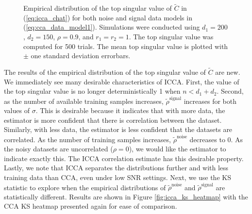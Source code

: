 \begin{figure}[h!]
{    \label{fig:icca_errorbars_high_snf}
  }
  \caption{Empirical distribution of the top singular value of $\widetilde{C}$ in
    (\ref{eq:icca_chat}) for both noise and signal data models in
    (\ref{eq:cca_data_model1}). Simulations were conducted using $d_1=200$, $d_2=150$,
    $\rho=0.9$, and $r_1=r_2=1$. The top singular value was computed for 500 trials. The
    mean top singular value is plotted with $\pm$ one standard deviation errorbars.}
  \label{fig:icca_errorbars}
\end{figure}

The results of the empirical distribution of the top singular value of $\widetilde{C}$ are
new. We immediately see many desirable characteristics of ICCA. First, the value of the
top singular value is no longer deterministically 1 when $n<d_1+d_2$. Second, as the
number of available training samples increases, $\tilde{\rho}^{\text{signal}}$ increases
for both values of $\sigma$.  This is desirable because it indicates that with more data,
the estimator is more confident that there is correlation between the dataset. Similarly,
with less data, the estimator is less confident that the datasets are correlated. As the
number of training samples increases, $\widetilde{\rho}^{\text{noise}}$ decreases to 0.
As the noisy datasets are uncorrelated ($\rho=0$), we would like the estimator to indicate
exactly this. The ICCA correlation estimate has this desirable property. Lastly, we note
that ICCA separates the distributions further and with less training data than CCA, even
under low SNR settings. Next, we use the KS statistic to explore when the empirical
distributions of $\widetilde{\rho}^{\text{noise}}$ and $\widetilde{\rho}^{\text{signal}}$
are statistically different. Results are shown in Figure \ref{fig:icca_ks_heatmap} with
the CCA KS heatmap presented again for ease of comparison.


